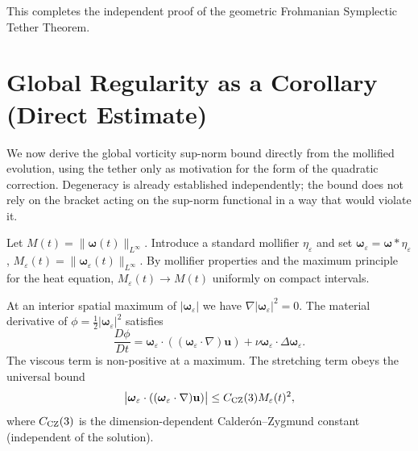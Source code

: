 \documentclass[11pt,a4paper]{article}
\begin{document}
This completes the independent proof of the geometric Frohmanian Symplectic Tether Theorem.

\section{Global Regularity as a Corollary (Direct Estimate)}

We now derive the global vorticity sup-norm bound directly from the mollified evolution, using the tether only as motivation for the form of the quadratic correction. Degeneracy is already established independently; the bound does not rely on the bracket acting on the sup-norm functional in a way that would violate it.

Let \(M(t) = \|\boldsymbol{\omega}(t)\|_{L^\infty}\). Introduce a standard mollifier \(\eta_\varepsilon\) and set \(\boldsymbol{\omega}_\varepsilon = \boldsymbol{\omega} * \eta_\varepsilon\), \(M_\varepsilon(t) = \|\boldsymbol{\omega}_\varepsilon(t)\|_{L^\infty}\). By mollifier properties and the maximum principle for the heat equation, \(M_\varepsilon(t) \to M(t)\) uniformly on compact intervals.

At an interior spatial maximum of \(|\boldsymbol{\omega}_\varepsilon|\) we have \(\nabla |\boldsymbol{\omega}_\varepsilon|^2 = 0\). The material derivative of \(\phi = \frac12 |\boldsymbol{\omega}_\varepsilon|^2\) satisfies
\[
\frac{D\phi}{Dt} = \boldsymbol{\omega}_\varepsilon \cdot ((\boldsymbol{\omega}_\varepsilon \cdot \nabla)\mathbf{u}) + \nu \boldsymbol{\omega}_\varepsilon \cdot \Delta \boldsymbol{\omega}_\varepsilon.
\]
The viscous term is non-positive at a maximum. The stretching term obeys the universal bound
\[
\bigl| \boldsymbol{\omega}_\varepsilon \cdot ((\boldsymbol{\omega}_\varepsilon \cdot \nabla)\mathbf{u}) \bigr| \le C_{\rm CZ}(3) M_\varepsilon(t)^2,
\]
where \(C_{\rm CZ}(3)\) is the dimension-dependent Calderón–Zygmund constant (independent of the solution).
\end{document}
